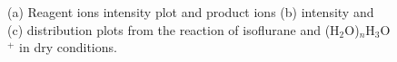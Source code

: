 

\begin{figure}%
\centering
{}



\caption{(a) Reagent ions intensity plot and product ions  (b) intensity and (c) distribution plots from the reaction of isoflurane and (H$_2$O)$_n$H$_3$O$^+$ in dry conditions.}
\label{fig:isof_h3o}
\end{figure}

